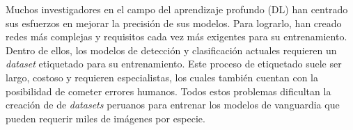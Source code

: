 Muchos investigadores en el campo del aprendizaje profundo (DL) 
han centrado sus esfuerzos en mejorar la precisión de sus modelos. Para 
lograrlo, han creado redes más complejas y requisitos cada vez más 
exigentes para su entrenamiento. Dentro de ellos, los modelos de detección 
y clasificación actuales requieren un \textit{dataset} etiquetado para su 
entrenamiento. Este proceso de etiquetado suele ser largo, costoso y requieren 
especialistas, los cuales también cuentan con la posibilidad de cometer 
errores humanos. Todos estos problemas dificultan la creación de de 
\textit{datasets} peruanos para entrenar los modelos de vanguardia que pueden 
requerir miles de imágenes por especie.
